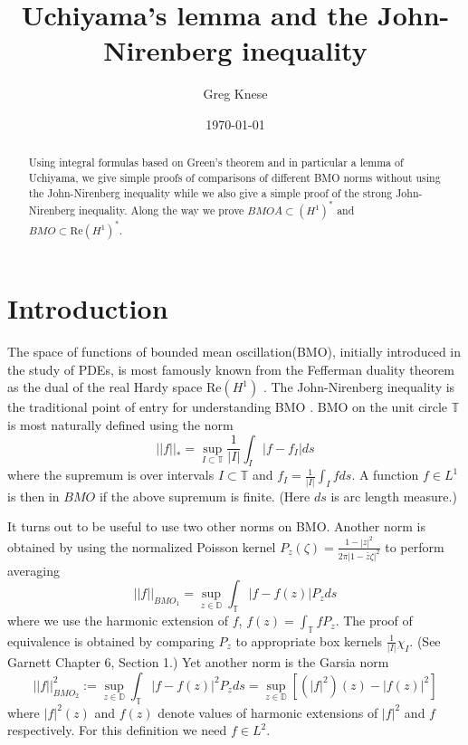 \documentclass[12pt]{amsart}
\title{Uchiyama's lemma and the John-Nirenberg inequality}
\author{Greg Knese}
\date{\today}
\theoremstyle{definition}
\theoremstyle{remark}
\numberwithin{equation}{section}
\newcommand{\D}{\mathbb{D}}
\newcommand{\T}{\mathbb{T}}
\begin{document}
\begin{abstract}
Using integral formulas based on Green's theorem and in particular a
lemma of Uchiyama, we give simple proofs of comparisons of different
BMO norms without using the John-Nirenberg inequality while we also
give a simple proof of the strong John-Nirenberg inequality. Along the
way we prove $BMOA \subset (H^1)^*$ and $BMO \subset
\text{Re}(H^1)^*$.
\end{abstract}

\maketitle

\section{Introduction}
The space of functions of bounded mean oscillation(BMO), initially
introduced in the study of PDEs, is most famously known from the
Fefferman duality theorem as the dual of the real Hardy space
$\text{Re}(H^1)$ \cite{cF71}.  The John-Nirenberg inequality is the
traditional point of entry for understanding BMO \cite{JN61}.  BMO on
the unit circle $\T$ is most naturally defined using the norm
\[
||f||_{*} = \sup_{I \subset \T} \frac{1}{|I|} \int_{I} |f - f_I| ds
\]
where the supremum is over intervals $I \subset \T$ and $f_I =
\frac{1}{|I|} \int_{I} fds $. A function $f\in L^1$ is then in $BMO$
if the above supremum is finite. (Here $ds$ is arc length measure.)

It turns out to be useful to use two other norms on BMO.  Another norm
is obtained by using the normalized Poisson kernel $P_z(\zeta) =
\frac{1-|z|^2}{2\pi|1-\bar{z}\zeta|^2}$ to perform averaging
\[
||f||_{BMO_1} = \sup_{z \in \D} \int_{\T} |f - f(z)|P_z ds
\]
where we use the harmonic extension of $f$, $f(z) = \int_{\T} f
P_z$. The proof of equivalence is obtained by comparing $P_z$ to
appropriate box kernels $\frac{1}{|I|} \chi_I$.  (See Garnett
\cite{jG07} Chapter 6, Section 1.) Yet another norm is the Garsia norm
\[
||f||^2_{BMO_2} := \sup_{z\in \D} \int_{\T} |f - f(z)|^2P_zds = \sup_{z \in \D}
[(|f|^2)(z) - |f(z)|^2]
\]
where $|f|^2(z)$ and $f(z)$ denote values of harmonic extensions of
$|f|^2$ and $f$ respectively. For this definition we need $f \in L^2$.
\end{document}
